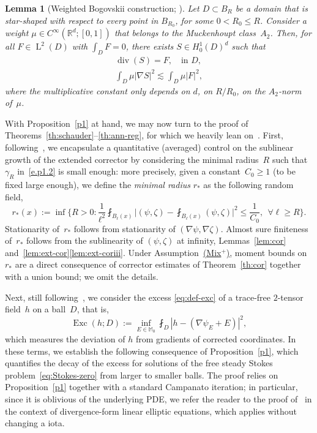 \documentclass[JEP,XML,SOM,Unicode,published]{cedram}
\newcommand{\Mix}{\hyperref[Mix+]{\textup{(Mix$^+$)}}\xspace}
\theoremstyle{plain}
\newtheorem{lem}[theor]{Lemma}
\theoremstyle{definition}
\newcommand{\Exc}{\operatorname{Exc}}
\newcommand{\R}{\mathbb R}
\newcommand{\Md}{\mathbb M}
\newcommand{\Ld}{\operatorname{L}}
\newcommand{\Div}{{\operatorname{div}}}
\begin{document}
\begin{lem}[Weighted Bogovskii construction; \cite{DRS-10}]\label{lem:muck}
Let $D\subset B_R$ be a domain that is star-shaped with respect to every point in $B_{R_0}$, for some $0<R_0 \le R$.
Consider a weight $\mu\in C^\infty(\R^d;[0,1])$ that belongs to the Muckenhoupt class~$A_2$. Then, for all $F\in\Ld^2(D)$ with $\int_DF=0$, there exists $S\in H^1_0(D)^d$ such that
\begin{gather*}
\Div (S)=F,\quad\text{in $D$},\\
\int_D\mu|\nabla S|^2\lesssim \int_D\mu|F|^2,
\end{gather*}
where the multiplicative constant only depends on $d$, on $R/R_0$, on the $A_2$-norm of~$\mu$.
\end{lem}

With Proposition~\ref{p1} at hand, we may now turn to the proof of Theorems~\ref{th:schauder}--\ref{th:ann-reg}, for which we heavily lean on~\cite{GNO-reg,DO1}.
First, following~\cite{GNO-reg}, we encapsulate a quantitative (averaged) control on the sublinear growth of the extended corrector by considering the minimal radius~$R$ such that $\gamma_R$ in~\eqref{e.p1.2} is small enough:
more precisely, given a constant~$C_0\ge1$ (to be fixed large enough),
we define the \emph{minimal radius} $r_*$ as the following random field,
\begin{equation}\label{e.def-r*}
r_*(x):=\inf\bigg\{R>0 : \frac1{\ell^2} \fint_{B_\ell(x)} \Big|(\psi,\zeta)-\fint_{B_\ell(x)} (\psi,\zeta)\Big|^2 \le \frac1{C_0},~~\forall \ell\ge R \bigg\}.
\end{equation}
Stationarity of~$r_*$ follows from stationarity of $(\nabla\psi,\nabla\zeta)$.
Almost sure finiteness of~$r_*$ follows from the sublinearity of $(\psi,\zeta)$ at infinity, \cf Lemmas~\ref{lem:cor} and~\ref{lem:ext-cor}\eqref{lem:ext-coriii}. Under Assumption~\Mix, moment bounds on $r_*$ are a direct consequence of corrector estimates of Theorem~\ref{th:cor} together with a union bound; we omit the details.

Next, still following~\cite{GNO-reg}, we consider the excess \eqref{eq:def-exc} of a trace-free $2$-tensor field~$h$ on a ball~$D$, that is,
\begin{equation*}
\Exc(h;D):=\inf_{E\in \Md_0 }\fint_{D} |h-(\nabla\psi_E+E)|^2,
\end{equation*}
which measures the deviation of $h$ from gradients of corrected coordinates.
In these terms, we establish the following consequence of Proposition~\ref{p1}, which quantifies the decay of the excess for solutions of the free steady Stokes problem~\eqref{eq:Stokes-zero} from larger to smaller balls.
The proof relies on Proposition~\ref{p1} together with a standard Campanato iteration;
in particular, since it is oblivious of the underlying PDE, we refer the reader to the proof of~\cite[Th.\,1]{GNO-reg} in the context of divergence-form linear elliptic equations, which applies without changing a iota.
\end{document}
